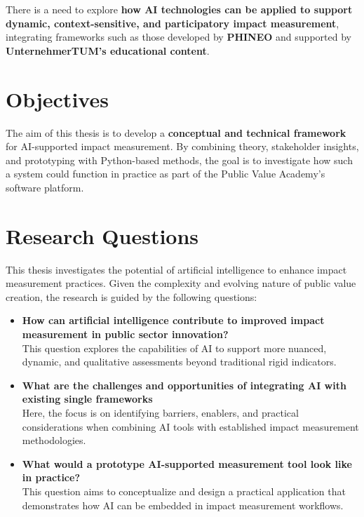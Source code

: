 There is a need to explore \textbf{how AI technologies can be applied to support dynamic, context-sensitive, and participatory impact measurement}, integrating frameworks such as those developed by \textbf{PHINEO} and supported by \textbf{UnternehmerTUM’s educational content}.

\section{Objectives}\label{sec:objectives}
The aim of this thesis is to develop a \textbf{conceptual and technical framework} for AI-supported impact measurement.
By combining theory, stakeholder insights, and prototyping with Python-based methods, the goal is to investigate how such a system could function in practice as part of the Public Value Academy’s software platform.

\section{Research Questions}\label{sec:research-questions}

This thesis investigates the potential of artificial intelligence to enhance impact measurement practices.
Given the complexity and evolving nature of public value creation, the research is guided by the following questions:

\begin{itemize}
  \item \textbf{How can artificial intelligence contribute to improved impact measurement in public sector innovation?} \\
  This question explores the capabilities of AI to support more nuanced, dynamic, and qualitative assessments beyond traditional rigid indicators.

  \item \textbf{What are the challenges and opportunities of integrating AI with existing single frameworks} \\
  Here, the focus is on identifying barriers, enablers, and practical considerations when combining AI tools with established impact measurement methodologies.

  \item \textbf{What would a prototype AI-supported measurement tool look like in practice?} \\
  This question aims to conceptualize and design a practical application that demonstrates how AI can be embedded in impact measurement workflows.
\end{itemize}

